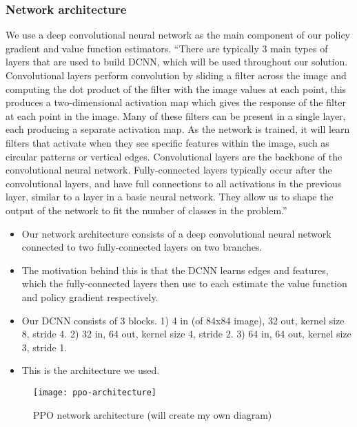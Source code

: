 \documentclass[12pt,a4paper]{article}
\begin{document}
\subsubsection{Network architecture}
We use a deep convolutional neural network as the main component of our policy gradient and value function estimators. ``There are typically 3 main types of layers that are used to build DCNN, which will be
used throughout our solution. Convolutional layers perform convolution by sliding a filter
across the image and computing the dot product of the filter with the image values at each
point, this produces a two-dimensional activation map which gives the response of the filter
at each point in the image. Many of these filters can be present in a single layer, each
producing a separate activation map. As the network is trained, it will learn filters that
activate when they see specific features within the image, such as circular patterns or vertical
edges. Convolutional layers are the backbone of the convolutional neural network. Fully-connected layers typically occur after the
convolutional layers, and have full connections to all activations in the previous
layer, similar to a layer in a basic neural network. They allow us to shape the output of the
network to fit the number of classes in the problem.''

\begin{itemize}
    \item Our network architecture consists of a deep convolutional neural network connected to two fully-connected layers on two branches. 
    \item The motivation behind this is that the DCNN learns edges and features, which the fully-connected layers then use to each estimate the value function and policy gradient respectively.
    \item Our DCNN consists of 3 blocks. 1) 4 in (of 84x84 image), 32 out, kernel size 8, stride 4. 2) 32 in, 64 out, kernel size 4, stride 2. 3) 64 in, 64 out, kernel size 3, stride 1.
    \item This is the architecture we used.
\end{itemize}

\begin{figure}[h]
\centering
\texttt{[image: ppo-architecture]}
\caption{PPO network architecture (will create my own diagram)}
\end{figure}
    
\end{document}
